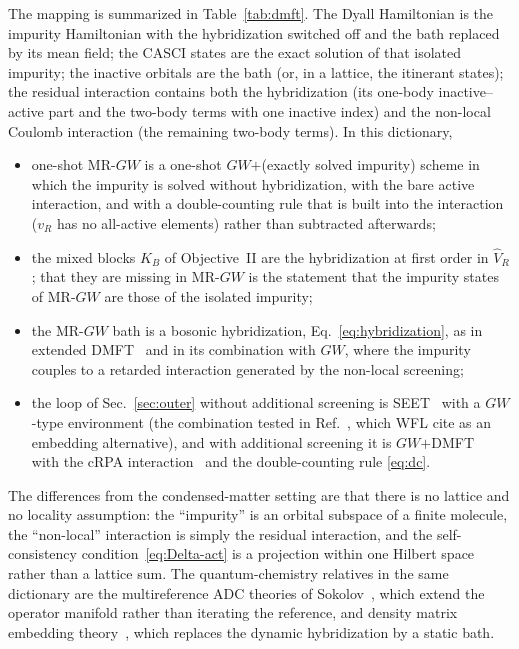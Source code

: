 \documentclass[11pt,a4paper]{article}
\newcommand{\GW}{$GW$}
\newcommand{\MRGW}{MR-$GW$}
\newcommand{\WFL}{WFL}
\begin{document}
The mapping is summarized in Table~\ref{tab:dmft}.  The Dyall Hamiltonian is
the impurity Hamiltonian with the hybridization switched off and the bath
replaced by its mean field; the CASCI states are the exact solution of that
isolated impurity; the inactive orbitals are the bath (or, in a lattice, the
itinerant states); the residual interaction contains both the hybridization
(its one-body inactive--active part and the two-body terms with one inactive
index) and the non-local Coulomb interaction (the remaining two-body
terms).  In this dictionary,
\begin{itemize}[leftmargin=2em]
\item one-shot \MRGW{} is a one-shot \GW{}$+$(exactly solved impurity)
  scheme in which the impurity is solved without hybridization, with the
  bare active interaction, and with a double-counting rule that is built into
  the interaction ($v_R$ has no all-active elements) rather than subtracted
  afterwards;
\item the mixed blocks $K_B$ of Objective~II are the hybridization at first
  order in $\hat V_R$; that they are missing in \MRGW{} is the statement that
  the impurity states of \MRGW{} are those of the isolated impurity;
\item the \MRGW{} bath is a bosonic hybridization,
  Eq.~\eqref{eq:hybridization}, as in extended DMFT~\cite{SiSmith1996} and
  in its combination with \GW{}, where the impurity couples to a retarded
  interaction generated by the non-local screening;
\item the loop of Sec.~\ref{sec:outer} without additional screening is
  SEET~\cite{Lan2015,Lan2017} with a \GW{}-type environment (the combination
  tested in Ref.~\cite{Lan2017}, which \WFL{} cite as an embedding
  alternative), and with additional screening it is
  \GW{}$+$DMFT~\cite{Biermann2003} with the cRPA
  interaction~\cite{Aryasetiawan2004} and the double-counting rule
  \eqref{eq:dc}.
\end{itemize}
The differences from the condensed-matter setting are that there is no
lattice and no locality assumption: the ``impurity'' is an orbital subspace
of a finite molecule, the ``non-local'' interaction is simply the residual
interaction, and the self-consistency condition~\eqref{eq:Delta-act} is a
projection within one Hilbert space rather than a lattice sum.  The
quantum-chemistry relatives in the same dictionary are the multireference
ADC theories of Sokolov~\cite{Sokolov2018,ChatterjeeSokolov2019}, which extend
the operator manifold rather than iterating the reference, and density
matrix embedding theory~\cite{Knizia2012}, which replaces the dynamic
hybridization by a static bath.
\end{document}
